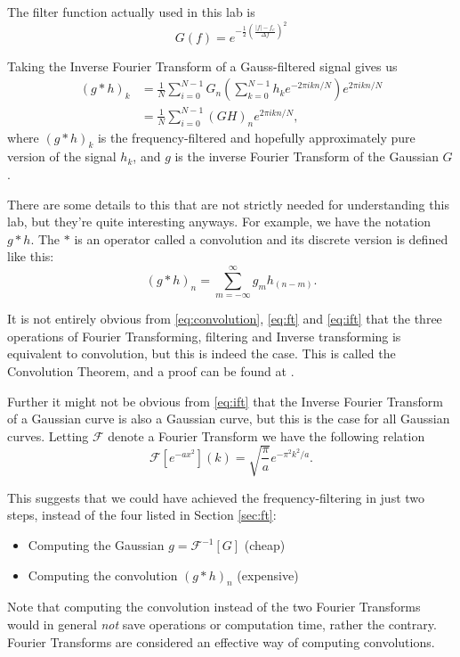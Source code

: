 \documentclass[12pt,a4paper]{article}
\begin{document}
The filter function actually used in this lab is
\begin{equation}\label{eq:filter_fct}
  G(f) = e^{-\frac12\left(\frac{|f| - f_c}{\Delta f} \right)^2}
\end{equation}

Taking the Inverse Fourier Transform of a Gauss-filtered signal gives us
\begin{align}
  (g*h)_k &= \frac1N\sum_{i=0}^{N-1}G_n(\sum_{k=0}^{N-1} h_ke^{-2\pi ikn/N})e^{2\pi ikn/N}\\
          &= \frac1N\sum_{i=0}^{N-1}(GH)_ne^{2\pi ikn/N},
\end{align}
where $(g*h)_k$ is the frequency-filtered and hopefully approximately pure version of
the signal $h_k$, and $g$ is the inverse Fourier Transform of the Gaussian $G$.

There are some details to this that are not strictly needed for understanding this
lab, but they're quite interesting anyways. 
For example, we have the notation $g*h$.
The $*$ is an operator called a convolution and its
discrete version is defined like this:
\begin{equation}\label{eq:convolution}
  (g*h)_n = \sum_{m=-\infty}^{\infty} g_m h_{(n-m)}.
\end{equation}

It is not entirely obvious from \eqref{eq:convolution}, \eqref{eq:ft} and \eqref{eq:ift} that
the three operations of Fourier Transforming, filtering and Inverse transforming is equivalent
to convolution, but this is indeed the case. This is called the Convolution Theorem, and
a proof can be found at \cite{convolution_theorem}.

Further it might not be obvious from \eqref{eq:ift} that the Inverse Fourier Transform of a
Gaussian curve is also a Gaussian curve, but this is the case for all Gaussian curves.
Letting $\mathcal{F}$ denote a Fourier Transform we have the following relation
\[
  \mathcal{F}\left[e^{-ax^2} \right](k) = \sqrt{\frac{\pi}{a}} e^{-\pi^2k^2/a}.
\]

This suggests that we could have achieved the frequency-filtering in just two steps,
instead of the four listed in Section \ref{sec:ft}:
\begin{itemize}
  \item Computing the Gaussian $g=\mathcal{F}^{-1}[G]$ (cheap)
  \item Computing the convolution $(g*h)_n$ (expensive)
\end{itemize}

Note that computing the convolution instead of the two Fourier Transforms would in general \emph{not}
save operations or computation time, rather the contrary. Fourier Transforms are considered
an effective way of computing convolutions\cite{paper}.
\end{document}
